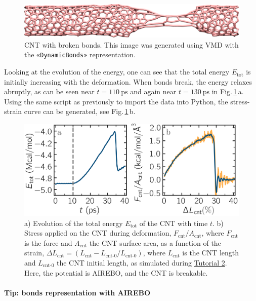 \documentclass[9pt,tutorial]{livecoms}
\newcommand{\guicmd}[1]{\textcolor{command}{\texttt{«#1»}}} %
\begin{document}
\begin{figure}
\centering
\includegraphics[width=\linewidth]{CNT-deformed-breakable}
\caption{CNT with broken bonds.  This image was generated using
VMD \cite{vmd_home,humphrey1996vmd} with the \guicmd{DynamicBonds} representation.}
\label{fig:CNT-deformed-breakable}
\end{figure}

Looking at the evolution of the energy, one can see that the total energy $E_\text{tot}$ is initially increasing with the deformation.  When bonds break, the energy relaxes abruptly,
as can be seen near $t=110~\text{ps}$ and again near $t=130~\text{ps}$ in
Fig.\,\ref{fig:CNT-deformed-breakable}\,a.  Using the same script as previously to
import the data into Python, the stress-strain
curve can be generated, see Fig.\,\ref{fig:CNT-deformed-breakable}\,b.

\begin{figure}
\centering
\includegraphics[width=\linewidth]{CNT-breakable-stress-energy}
\caption{a) Evolution of the total energy $E_\text{tot}$ of the CNT with time $t$.
b) Stress applied on the CNT during deformation, $F_\text{cnt}/A_\text{cnt}$,
where $F_\text{cnt}$ is the force and $A_\text{cnt}$ the CNT surface area,
as a function of the strain, $\Delta L_\text{cnt} = (L_\text{cnt}-L_\text{cnt-0}/L_\text{cnt-0})$, where
$L_\text{cnt}$ is the CNT length and $L_\text{cnt-0}$ the CNT initial length,
as simulated during \hyperref[carbon-nanotube-label]{Tutorial 2}.
Here, the potential is AIREBO, and the CNT is breakable.}
\label{fig:CNT-breakable-energy-stress}
\end{figure}

\paragraph{Tip: bonds representation with AIREBO}
\end{document}
